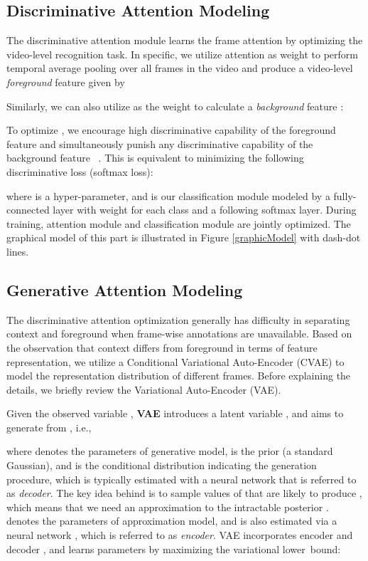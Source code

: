 \documentclass[10pt,twocolumn,letterpaper]{article}
\begin{document}
\subsection{Discriminative Attention Modeling}

The discriminative attention module learns the frame attention by optimizing the video-level recognition task.
In specific, we utilize attention  as weight to perform temporal average pooling over all frames in the video and produce a video-level \emph{foreground} feature  given by

Similarly, we can also utilize  as the weight to calculate a \emph{background} feature :

To optimize , we encourage high discriminative capability of the foreground feature  and simultaneously punish any discriminative capability of the background feature ~\cite{nguyen2019weakly}.
This is equivalent to minimizing the following discriminative loss (\ie softmax loss):

where  is a hyper-parameter, and  is our classification module modeled by a fully-connected layer with weight  for each class  and a following softmax layer. During training, attention module and classification module are jointly optimized.
The graphical model of this part is illustrated in Figure \ref{graphicModel} with dash-dot lines.


\subsection{Generative Attention Modeling}

The discriminative attention optimization generally has difficulty in separating context and foreground when frame-wise annotations are unavailable.
Based on the observation that context differs from foreground in terms of feature representation, we utilize a Conditional Variational Auto-Encoder (CVAE) to model the representation distribution of different frames.
Before explaining the details, we briefly review the Variational Auto-Encoder (VAE).

Given the observed variable , \textbf{VAE} \cite{kingma2013auto} introduces a latent variable , and aims to generate  from , i.e.,

where  denotes the parameters of generative model,  is the prior (\eg a standard Gaussian),
and  is the conditional distribution indicating the generation procedure, which is typically estimated with a neural network  that is referred to as \emph{decoder}.
The key idea behind is to sample values of  that are likely to produce , which means that we need an approximation  to the intractable posterior .
 denotes the parameters of approximation model, and  is also estimated via a neural network , which is referred to as \emph{encoder}.
VAE incorporates encoder  and decoder , and learns parameters by maximizing the variational lower~bound:
\end{document}
